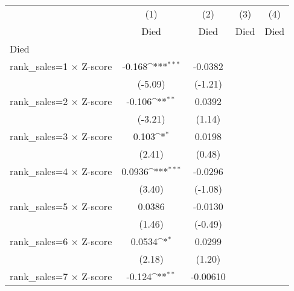 {
\def\sym#1{\ifmmode^{#1}\else\(^{#1}\)\fi}
\begin{tabular}{l*{4}{c}}
\hline\hline
                    &\multicolumn{1}{c}{(1)}&\multicolumn{1}{c}{(2)}&\multicolumn{1}{c}{(3)}&\multicolumn{1}{c}{(4)}\\
                    &\multicolumn{1}{c}{Died}&\multicolumn{1}{c}{Died}&\multicolumn{1}{c}{Died}&\multicolumn{1}{c}{Died}\\
\hline
Died                &                     &                     &                     &                     \\
rank\_sales=1 $\times$ Z-score&      -0.168\sym{***}&     -0.0382         &                     &                     \\
                    &     (-5.09)         &     (-1.21)         &                     &                     \\
rank\_sales=2 $\times$ Z-score&      -0.106\sym{**} &      0.0392         &                     &                     \\
                    &     (-3.21)         &      (1.14)         &                     &                     \\
rank\_sales=3 $\times$ Z-score&       0.103\sym{*}  &      0.0198         &                     &                     \\
                    &      (2.41)         &      (0.48)         &                     &                     \\
rank\_sales=4 $\times$ Z-score&      0.0936\sym{***}&     -0.0296         &                     &                     \\
                    &      (3.40)         &     (-1.08)         &                     &                     \\
rank\_sales=5 $\times$ Z-score&      0.0386         &     -0.0130         &                     &                     \\
                    &      (1.46)         &     (-0.49)         &                     &                     \\
rank\_sales=6 $\times$ Z-score&      0.0534\sym{*}  &      0.0299         &                     &                     \\
                    &      (2.18)         &      (1.20)         &                     &                     \\
rank\_sales=7 $\times$ Z-score&      -0.124\sym{**} &    -0.00610         &                     &                     \\

\end{tabular}}

